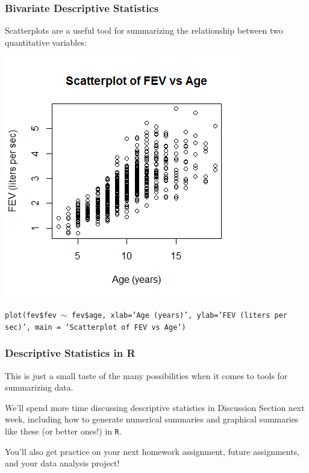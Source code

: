 \documentclass[12pt, 
hyperref={colorlinks=true, linkcolor=blue, urlcolor=cyan}]{beamer}
\begin{document}
\begin{frame}
\frametitle{Bivariate Descriptive Statistics}

Scatterplots are a useful tool for summarizing the relationship between two quantitative variables:

\vspace{-0.8cm} \center \includegraphics[height=0.65\textheight]{./scatterplot-fev-age}

\vspace{-0.4cm} \begin{scriptsize} \texttt{plot(fev\$fev $\sim$ fev\$age, xlab='Age (years)', ylab='FEV (liters per sec)', main = 'Scatterplot of FEV vs Age')\\} \end{scriptsize}

\end{frame}

\begin{frame}
\frametitle{Descriptive Statistics in R}

This is just a small taste of the many possibilities when it comes to tools for summarizing data.

We'll spend more time discussing descriptive statistics in Discussion Section next week, including how to generate numerical summaries and graphical summaries like these (or better ones!) in \texttt{R}.

You'll also get practice on your next homework assignment, future assignments, and your data analysis project!

\end{frame}
\end{document}
